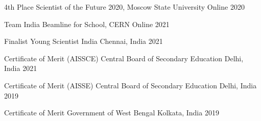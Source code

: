 



\begin{cvhonors}

  \cvhonor
  {4th Place} %
  {Scientist of the Future 2020, Moscow State University} %
  {Online} %
  {2020} %


  \cvhonor
  {Team India} %
  {Beamline for School, CERN} %
  {Online} %
  {2021} %
\end{cvhonors}




\begin{cvhonors}

  \cvhonor
  {Finalist} %
  {Young Scientist India} %
  {Chennai, India} %
  {2021} %

  \cvhonor
  {Certificate of Merit (AISSCE)} %
  {Central Board of Secondary Education} %
  {Delhi, India} %
  {2021} %

  \cvhonor
  {Certificate of Merit (AISSE)} %
  {Central Board of Secondary Education} %
  {Delhi, India} %
  {2019} %

  \cvhonor
  {Certificate of Merit} %
  {Government of West Bengal} %
  {Kolkata, India} %
  {2019} %
\end{cvhonors}



